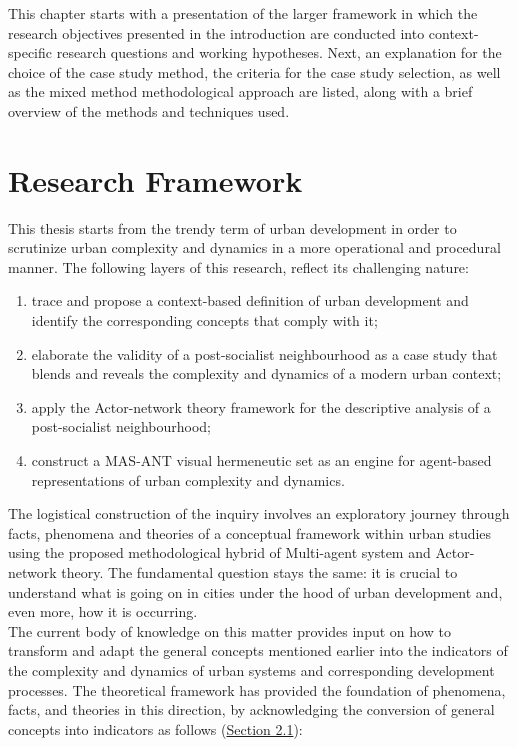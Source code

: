 \documentclass[11pt]{report}
\begin{document}
This chapter starts with a presentation of the larger framework in which the research objectives presented in the introduction are conducted into context-specific research questions and working hypotheses. Next, an explanation for the choice of the case study method, the criteria for the case study selection, as well as the mixed method methodological approach are listed, along with a brief overview of the methods and techniques used.


\section{Research Framework}

This thesis starts from the trendy term of urban development in order to scrutinize urban complexity and dynamics in a more operational and procedural manner. The following layers of this research, reflect its challenging nature:

\begin{enumerate}
\item trace and propose a context-based definition of urban development and identify the corresponding concepts that comply with it;
\item elaborate the validity of a post-socialist neighbourhood as a case study that blends and reveals the complexity and dynamics of a modern urban context;
\item apply the Actor-network theory framework for the descriptive analysis of a post-socialist neighbourhood;
\item construct a MAS-ANT visual hermeneutic set as an engine for agent-based representations of urban complexity and dynamics.    
\end{enumerate}

The logistical construction of the inquiry involves an exploratory journey through facts, phenomena and theories of a conceptual framework within urban studies using the proposed methodological hybrid of Multi-agent system and Actor-network theory. The fundamental question stays the same: it is crucial to understand what is going on in cities under the hood of urban development and, even more, how it is occurring.
\\

The current body of knowledge on this matter provides input on how to transform and adapt the general concepts mentioned earlier into the indicators of the complexity and dynamics of urban systems and corresponding development processes. The theoretical framework has provided the foundation of phenomena, facts, and theories in this direction, by acknowledging the conversion of general concepts into indicators as follows (\href{Section 2.1}{Section 2.1}):
\end{document}
